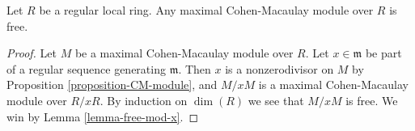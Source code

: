 \begin{lemma}
\label{lemma-regular-mcm-free}
Let $R$ be a regular local ring.
Any maximal Cohen-Macaulay module over $R$ is free.
\end{lemma}

\begin{proof}
Let $M$ be a maximal Cohen-Macaulay module over $R$.
Let $x \in \mathfrak m$ be part of a regular sequence
generating $\mathfrak m$. Then $x$ is a nonzerodivisor
on $M$ by Proposition \ref{proposition-CM-module}, and
$M/xM$ is a maximal Cohen-Macaulay module over $R/xR$.
By induction on $\dim(R)$ we see that $M/xM$ is free.
We win by Lemma \ref{lemma-free-mod-x}.
\end{proof}
